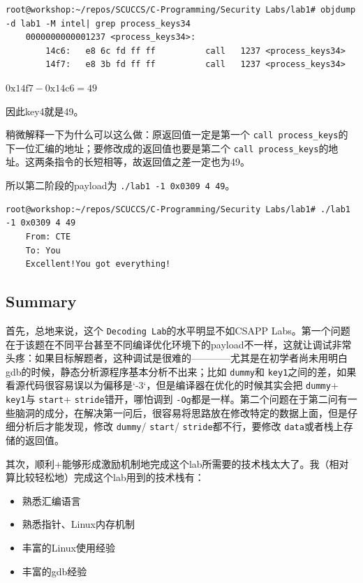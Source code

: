 \documentclass[a4pper,12pt,onecolumn]{article}
\begin{document}
\begin{lstlisting}[style=DOS]
    root@workshop:~/repos/SCUCCS/C-Programming/Security Labs/lab1# objdump -d lab1 -M intel| grep process_keys34
    0000000000001237 <process_keys34>:
        14c6:	e8 6c fd ff ff       	call   1237 <process_keys34>
        14f7:	e8 3b fd ff ff       	call   1237 <process_keys34>
\end{lstlisting}

$ \mathrm{0x14f7}-\mathrm{0x14c6}=49 $

因此key4就是49。

稍微解释一下为什么可以这么做：原返回值一定是第一个 \texttt{call process\_keys}的下一位汇编的地址；要修改成的返回值也要是第二个 \texttt{call process\_keys}的地址。这两条指令的长短相等，故返回值之差一定也为49。

所以第二阶段的payload为 \texttt{./lab1 -1 0x0309 4 49}。

\begin{lstlisting}[style=DOS]
    root@workshop:~/repos/SCUCCS/C-Programming/Security Labs/lab1# ./lab1 -1 0x0309 4 49
    From: CTE
    To: You
    Excellent!You got everything!
\end{lstlisting}

\subsection{Summary}

首先，总地来说，这个 \texttt{Decoding Lab}的水平明显不如CSAPP Labs。第一个问题在于该题在不同平台甚至不同编译优化环境下的payload不一样，这就让调试非常头疼：如果目标解题者，这种调试是很难的————尤其是在初学者尚未用明白gdb的时候，静态分析源程序基本分析不出来；比如 \texttt{dummy}和 \texttt{key1}之间的差，如果看源代码很容易误以为偏移是`-3`，但是编译器在优化的时候其实会把 \texttt{dummy}+ \texttt{key1}与 \texttt{start}+ \texttt{stride}错开，哪怕调到 \texttt{-Og}都是一样。第二个问题在于第二问有一些脑洞的成分，在解决第一问后，很容易将思路放在修改特定的数据上面，但是仔细分析后才能发现，修改 \texttt{dummy}/ \texttt{start}/ \texttt{stride}都不行，要修改 \texttt{data}或者栈上存储的返回值。

其次，顺利+能够形成激励机制地完成这个lab所需要的技术栈太大了。我（相对算比较轻松地）完成这个lab用到的技术栈有：

\begin{itemize}
\item 熟悉汇编语言
\item 熟悉指针、Linux内存机制
\item 丰富的Linux使用经验
\item 丰富的gdb经验
\end{itemize}
\end{document}

